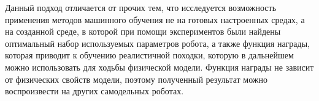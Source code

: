 Данный подход отличается от прочих тем, что исследуется возможность применения методов машинного обучения не на готовых настроенных средах, а на созданной среде, в которой при помощи экспериментов были найдены оптимальный набор используемых параметров робота, а также функция награды, которая приводит к обучению реалистичной походки, которую в дальнейшем можно использовать для ходьбы физической модели. Функция награды не зависит от физических свойств модели, поэтому полученный результат можно воспроизвести на других самодельных роботах.